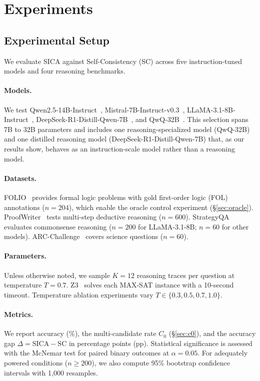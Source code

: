 \section{Experiments}
\label{sec:experiments}

\subsection{Experimental Setup}
\label{sec:exp-setup}

We evaluate SICA against Self-Consistency (SC) across five instruction-tuned models and four reasoning benchmarks.

\paragraph{Models.} We test Qwen2.5-14B-Instruct~\cite{yang2024qwen25}, Mistral-7B-Instruct-v0.3~\cite{jiang2023mistral}, LLaMA-3.1-8B-Instruct~\cite{dubey2024llama3}, DeepSeek-R1-Distill-Qwen-7B~\cite{guo2025deepseekr1}, and QwQ-32B~\cite{qwen2024qwq}. This selection spans 7B to 32B parameters and includes one reasoning-specialized model (QwQ-32B) and one distilled reasoning model (DeepSeek-R1-Distill-Qwen-7B) that, as our results show, behaves as an instruction-scale model rather than a reasoning model.

\paragraph{Datasets.} FOLIO~\cite{han2022folio} provides formal logic problems with gold first-order logic (FOL) annotations ($n=204$), which enable the oracle control experiment (\S\ref{sec:oracle}). ProofWriter~\cite{tafjord2021proofwriter} tests multi-step deductive reasoning ($n=600$). StrategyQA~\cite{geva2021strategyqa} evaluates commonsense reasoning ($n=200$ for LLaMA-3.1-8B; $n=60$ for other models). ARC-Challenge~\cite{clark2018arc} covers science questions ($n=60$).

\paragraph{Parameters.} Unless otherwise noted, we sample $K=12$ reasoning traces per question at temperature $T=0.7$. Z3~\cite{demoura2008z3} solves each MAX-SAT instance with a 10-second timeout. Temperature ablation experiments vary $T \in \{0.3, 0.5, 0.7, 1.0\}$.

\paragraph{Metrics.} We report accuracy (\%), the multi-candidate rate $C_0$ (\S\ref{sec:c0}), and the accuracy gap $\Delta = \text{SICA} - \text{SC}$ in percentage points (pp). Statistical significance is assessed with the McNemar test for paired binary outcomes at $\alpha = 0.05$. For adequately powered conditions ($n \geq 200$), we also compute 95\% bootstrap confidence intervals with 1{,}000 resamples.


